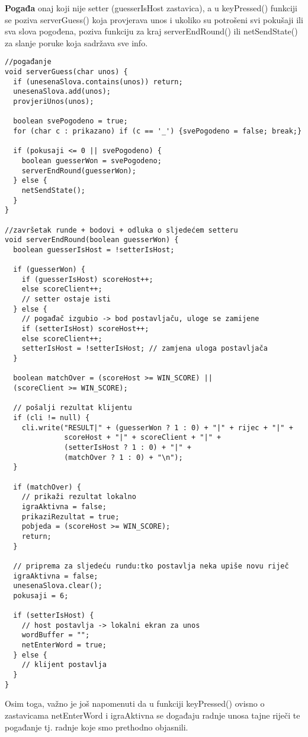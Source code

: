 \documentclass{article}
\begin{document}
\textbf{Pogađa} onaj koji nije setter (guesserIsHost zastavica), a u keyPressed() funkciji se poziva serverGuess() koja provjerava unos i ukoliko su potrošeni svi pokušaji ili sva slova pogođena, poziva funkciju za kraj serverEndRound() ili netSendState() za slanje poruke koja sadržava sve info. 

\begin{verbatim}
//pogađanje
void serverGuess(char unos) {
  if (unesenaSlova.contains(unos)) return;
  unesenaSlova.add(unos);
  provjeriUnos(unos);

  boolean svePogodeno = true;
  for (char c : prikazano) if (c == '_') {svePogodeno = false; break;}

  if (pokusaji <= 0 || svePogodeno) {
    boolean guesserWon = svePogodeno; 
    serverEndRound(guesserWon);
  } else {
    netSendState();
  }
}

//završetak runde + bodovi + odluka o sljedećem setteru
void serverEndRound(boolean guesserWon) {
  boolean guesserIsHost = !setterIsHost;

  if (guesserWon) {
    if (guesserIsHost) scoreHost++;
    else scoreClient++;
    // setter ostaje isti
  } else {
    // pogađač izgubio -> bod postavljaču, uloge se zamijene
    if (setterIsHost) scoreHost++;
    else scoreClient++;
    setterIsHost = !setterIsHost; // zamjena uloga postavljača
  }

  boolean matchOver = (scoreHost >= WIN_SCORE) || 
  (scoreClient >= WIN_SCORE);

  // pošalji rezultat klijentu
  if (cli != null) {
    cli.write("RESULT|" + (guesserWon ? 1 : 0) + "|" + rijec + "|" +
              scoreHost + "|" + scoreClient + "|" + 
              (setterIsHost ? 1 : 0) + "|" +
              (matchOver ? 1 : 0) + "\n");
  }

  if (matchOver) {
    // prikaži rezultat lokalno
    igraAktivna = false;
    prikaziRezultat = true;
    pobjeda = (scoreHost >= WIN_SCORE);
    return;
  }

  // priprema za sljedeću rundu:tko postavlja neka upiše novu riječ
  igraAktivna = false;
  unesenaSlova.clear();
  pokusaji = 6;

  if (setterIsHost) {
    // host postavlja -> lokalni ekran za unos
    wordBuffer = "";
    netEnterWord = true;
  } else {
    // klijent postavlja
  }
}
\end{verbatim}

Osim toga, važno je još napomenuti da u funkciji keyPressed() ovisno o zastavicama netEnterWord i igraAktivna se događaju radnje unosa tajne riječi te pogađanje tj. radnje koje smo prethodno objasnili.
\end{document}
